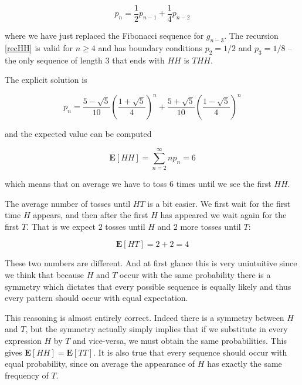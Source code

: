 \documentclass[12pt]{article}
\begin{document}
\begin{equation} \label{recHH}
p_{n} = \frac{1}{2} p_{n - 1} + \frac{1}{4} p_{n - 2}
\end{equation}

\noindent
where we have just replaced the Fibonacci sequence for $g_{n-3}$.
The recursion \eqref{recHH} is valid for $n \geq 4$ and has boundary 
conditions $p_{2} = 1/2$ and $p_{3} = 1/8$ -- the only sequence of
length $3$ that ends with $HH$ is $THH$.

The explicit solution is

\begin{equation}
p_{n} =  \frac{5 - \sqrt{5}}{10} \left( \frac{1 + \sqrt{5}}{4} \right)^{n} 
+ 
\frac{5 + \sqrt{5}}{10} \left( \frac{1 - \sqrt{5}}{4} \right)^{n} 
\end{equation}

\noindent
and the expected value can be computed

\begin{equation}
\mathbf{E} [ HH ] = \sum_{n = 2}^{\infty} n p_{n} = 6
\end{equation}

\noindent
which means that on average we have to toss $6$ times until
we see the first $HH$.

The average number of tosses until $HT$ is a bit easier.
We first wait for the first time $H$ appears, and
then after the first $H$ has appeared we wait again
for the first $T$.
That is we expect $2$ tosses until $H$ and $2$ more tosses
until $T$: 

\begin{equation}
\mathbf{E} [ HT ] = 2 + 2 = 4
\end{equation}

These two numbers are different. 
And at first glance this is very unintuitive since we think
that because $H$ and $T$ occur with the same probability
there is a symmetry which dictates that every possible sequence
is equally likely and thus every pattern should occur with equal
expectation.

This reasoning is almost entirely correct. Indeed there is a symmetry
between $H$ and $T$, but the symmetry actually simply implies that if 
we substitute in every expression $H$ by $T$ and vice-versa, we must
obtain the same probabilities. This gives $\mathbf{E} [ HH ] = \mathbf{E} [ TT ]$.
It is also true that every sequence should occur with equal probability, since
on average the appearance of $H$ has exactly the same frequency of $T$.
\end{document}
